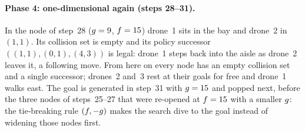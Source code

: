\paragraph{Phase 4: one-dimensional again (steps 28--31).} In the node of
step~28 ($g = 9$, $f = 15$) drone~1 sits in the bay and drone~2
in $(1,1)$. Its collision set is empty and its policy successor
$((1,1), (0,1), (4,3))$ is legal: drone~1 steps back into the aisle as
drone~2 leaves it, a following move. From here on every node has an empty
collision set and a single successor; drones~2 and~3 rest at their goals
for free and drone~1 walks east. The goal is generated in step~31 with
$g = 15$ and popped next, before the three nodes of steps~25--27 that
were re-opened at $f = 15$ with a smaller $g$: the tie-breaking
rule $(f, -g)$ makes the search dive to the goal instead of
widening those nodes first.

